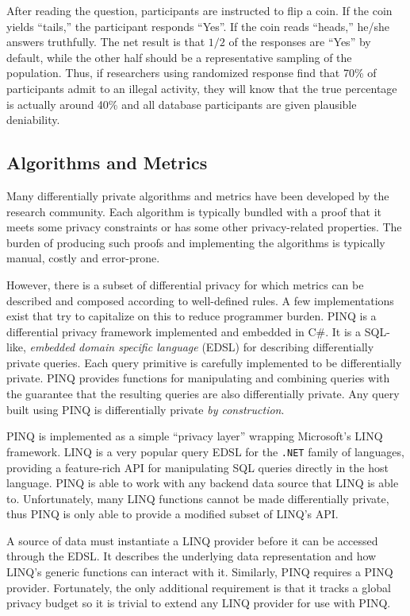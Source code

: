 \documentclass[12pt]{report}
\begin{document}
After reading the question, participants are instructed to flip a coin.
If the coin yields ``tails,'' the participant responds ``Yes''.
If the coin reads ``heads,'' he/she answers truthfully.
The net result is that $1/2$ of the responses are ``Yes'' by default, while the other half should be a representative sampling of the population.
Thus, if researchers using randomized response find that 70\% of participants admit to an illegal activity, they will know that the true percentage is actually around 40\% and all database participants are given plausible deniability.

\subsection{Algorithms and Metrics}

Many differentially private algorithms and metrics have been developed by the research community.
Each algorithm is typically bundled with a proof that it meets some privacy constraints or has some other privacy-related properties.
The burden of producing such proofs and implementing the algorithms is typically manual, costly and error-prone.

However, there is a subset of differential privacy for which metrics can be described and composed according to well-defined rules.
A few implementations exist that try to capitalize on this to reduce programmer burden.
PINQ\cite{conf/sigmod/McSherry09} is a differential privacy framework implemented and embedded in C\#.
It is a SQL-like, \textit{embedded domain specific language} (EDSL) for describing differentially private queries.
Each query primitive is carefully implemented to be differentially private.
PINQ provides functions for manipulating and combining queries with the guarantee that the resulting queries are also differentially private.
Any query built using PINQ is differentially private \textit{by construction}.

PINQ is implemented as a simple ``privacy layer'' wrapping Microsoft's LINQ framework.
LINQ is a very popular query EDSL for the \texttt{.NET} family of languages, providing a feature-rich API for manipulating SQL queries directly in the host language.
PINQ is able to work with any backend data source that LINQ is able to.
Unfortunately, many LINQ functions cannot be made differentially private, thus PINQ is only able to provide a modified subset of LINQ's API.

A source of data must instantiate a LINQ provider before it can be accessed through the EDSL.
It describes the underlying data representation and how LINQ's generic functions can interact with it.
Similarly, PINQ requires a PINQ provider.
Fortunately, the only additional requirement is that it tracks a global privacy budget so it is trivial to extend any LINQ provider for use with PINQ.
\end{document}
